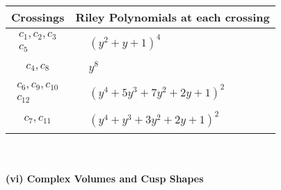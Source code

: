 \documentclass[1p]{elsarticle_modified}
\theoremstyle{definition}
\begin{document}
\begin{tabular}{m{50pt}|m{274pt}}
Crossings & \hspace{64pt}Riley Polynomials at each crossing \\
\hline $$\begin{aligned}c_{1},c_{2},c_{3}\\c_{5}\end{aligned}$$&$\begin{aligned}
&(y^2+y+1)^4
\end{aligned}$\\
\hline $$\begin{aligned}c_{4},c_{8}\end{aligned}$$&$\begin{aligned}
&y^8
\end{aligned}$\\
\hline $$\begin{aligned}c_{6},c_{9},c_{10}\\c_{12}\end{aligned}$$&$\begin{aligned}
&(y^4+5 y^3+7 y^2+2 y+1)^2
\end{aligned}$\\
\hline $$\begin{aligned}c_{7},c_{11}\end{aligned}$$&$\begin{aligned}
&(y^4+y^3+3 y^2+2 y+1)^2
\end{aligned}$\\
\hline
\end{tabular}\\~\\
\newpage\flushleft \textbf{(vi) Complex Volumes and Cusp Shapes}
\end{document}
